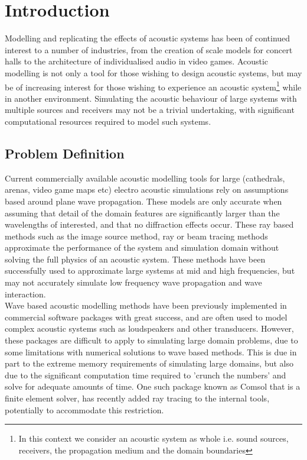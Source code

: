 \chapter{Introduction}

Modelling and replicating the effects of acoustic systems has been of continued interest to a number of industries, from the creation of scale models for concert halls to the architecture of individualised audio in video games. Acoustic modelling is not only a tool for those wishing to design acoustic systems, but may be of increasing interest for those wishing to experience an acoustic system\footnote{In this context we consider an acoustic system as whole i.e. sound sources, receivers, the propagation medium and the domain boundaries} while in another environment. Simulating the acoustic behaviour of large systems with multiple sources and receivers may not be a trivial undertaking, with significant computational resources required to model such systems. 

\section{Problem Definition}

Current commercially available acoustic modelling tools for large (cathedrals, arenas, video game maps etc) electro acoustic simulations rely on assumptions based around plane wave propagation. These models are only accurate when assuming that detail of the domain features are significantly larger than the wavelengths of interested, and that no diffraction effects occur. These ray based methods such as the image source method,
ray or beam tracing methods approximate the performance of the system and simulation domain without solving the full physics of an acoustic system. These methods have been successfully used to approximate large systems at mid and high frequencies, but may not accurately simulate low frequency wave propagation and wave interaction.\\

Wave based acoustic modelling methods have been previously implemented in commercial software packages with great success, and are often used to model complex acoustic systems such as loudspeakers and other transducers. However, these packages are difficult to apply to simulating large domain problems, due to some limitations with numerical solutions to wave based methods. This is due in part to the extreme memory requirements of simulating large domains, but also due to the significant computation time required to 'crunch the numbers' and solve for adequate amounts of time. One such package known as Comsol that is a finite element solver, has recently added ray tracing to the internal tools, potentially to accommodate this restriction.\\

